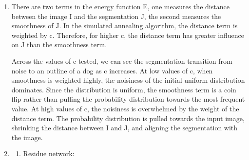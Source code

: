 \documentclass{article}
\begin{document}
\begin{enumerate}
    \item
    There are two terms in the energy function E, one measures the distance between the image I and the
    segmentation J, the second measures the smoothness of J. In the simulated annealing algorithm,
    the distance term is weighted by c. Therefore, for higher c, the distance term has greater influence
    on J than the smoothness term.

    Across the values of c tested, we can see the segmentation transition from noise to an outline of a dog
    as c increases. At low values of c, when smoothness is weighted highly, the noisiness of the initial
    uniform distribution dominates. Since the distribution is uniform, the smoothness term is a coin flip
    rather than pulling the probability distribution towards the most frequent value.
    At high values of c, the noisiness is overwhelmed by the weight of the distance term. The
    probability distribution is pulled towards the input image, shrinking the distance between I and J,
    and aligning the segmentation with the image.

    \item
        \begin{enumerate}
            \item
            Residue network:



\end{enumerate}
\end{enumerate}
\end{document}
